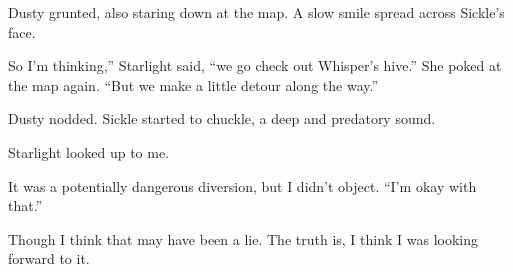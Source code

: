 Dusty grunted, also staring down at the map. A slow smile spread across Sickle’s face.

\leavevmode{}So I’m thinking,” Starlight said, “we go check out Whisper’s hive.” She poked at the map again. “But we make a little detour along the way.”

Dusty nodded. Sickle started to chuckle, a deep and predatory sound.

Starlight looked up to me.

It was a potentially dangerous diversion, but I didn’t object. “I’m okay with that.”

Though I think that may have been a lie. The truth is, I think I was looking forward to it.